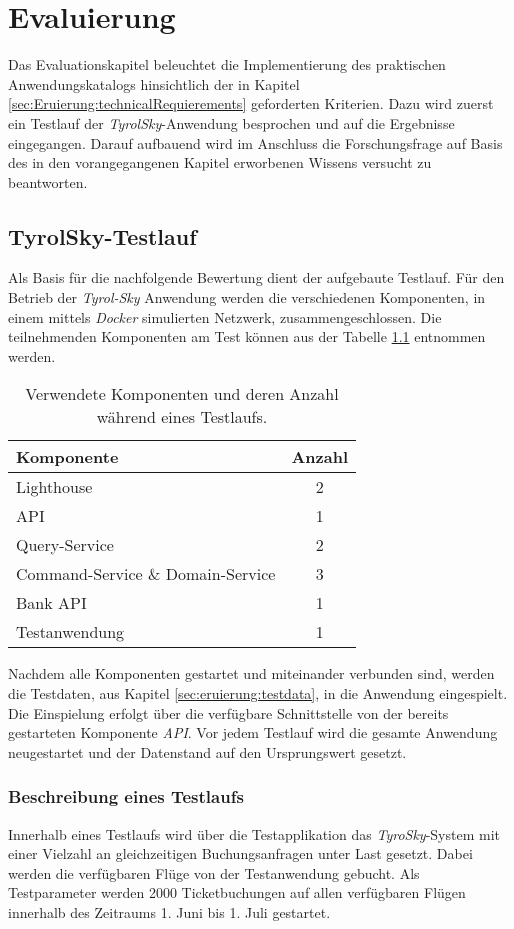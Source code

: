 \chapter{Evaluierung} 
\label{cha:evaluation}
Das Evaluationskapitel beleuchtet die Implementierung des praktischen Anwendungskatalogs hinsichtlich der in Kapitel \ref{sec:Eruierung:technicalRequierements} geforderten Kriterien. Dazu wird zuerst ein Testlauf der \textit{TyrolSky}-Anwendung besprochen und auf die Ergebnisse eingegangen. Darauf aufbauend wird im Anschluss die Forschungsfrage auf Basis des in den vorangegangenen Kapitel erworbenen Wissens versucht zu beantworten.

\section{TyrolSky-Testlauf}
Als Basis für die nachfolgende Bewertung dient der aufgebaute Testlauf. Für den Betrieb der \textit{Tyrol-Sky} Anwendung werden die verschiedenen Komponenten, in einem mittels \textit{Docker} simulierten Netzwerk, zusammengeschlossen. Die teilnehmenden Komponenten am Test können aus der Tabelle \ref{tab:evaluation:testStage} entnommen werden. \\
\begin{table}
  \centering
  \begin{tabular}{lc}
    Komponente    &  Anzahl \\ \hline
    Lighthouse    &  2    \\
    API       &  1    \\
    Query-Service  &  2    \\
    Command-Service \& Domain-Service &  3    \\
    Bank API     &  1    \\
    Testanwendung  &  1
  \end{tabular}
  \caption{Verwendete Komponenten und deren Anzahl während eines Testlaufs.}
  \label{tab:evaluation:testStage}
\end{table}
Nachdem alle Komponenten gestartet und miteinander verbunden sind, werden die Testdaten, aus Kapitel \ref{sec:eruierung:testdata}, in die Anwendung eingespielt. Die Einspielung erfolgt über die verfügbare Schnittstelle von der bereits gestarteten Komponente \textit{API}. Vor jedem Testlauf wird die gesamte Anwendung neugestartet und der Datenstand auf den Ursprungswert gesetzt. \\

\subsection{Beschreibung eines Testlaufs}
Innerhalb eines Testlaufs wird über die Testapplikation das \textit{TyroSky}-System mit einer Vielzahl an gleichzeitigen Buchungsanfragen unter Last gesetzt. Dabei werden die verfügbaren Flüge von der Testanwendung gebucht. Als Testparameter werden {2000} Ticketbuchungen auf allen verfügbaren Flügen innerhalb des Zeitraums 1. Juni bis 1. Juli gestartet. \\

